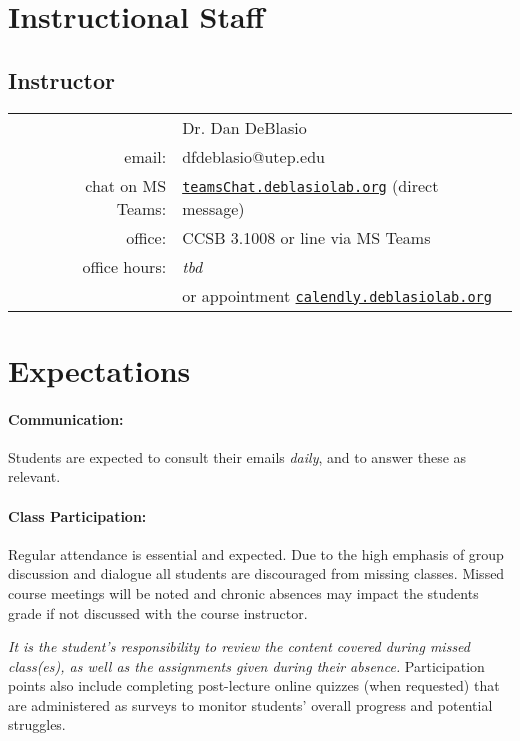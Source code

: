 \documentclass[12pt]{scrartcl}
\begin{document}
\section{Instructional Staff}

\subsection{Instructor}
\begin{tabular}{lrl}
& & Dr. Dan DeBlasio  \\
 & email: & dfdeblasio@utep.edu\\
 & chat on MS Teams: &  \href{http://teamsChat.deblasiolab.org}{\texttt{teamsChat.deblasiolab.org}} (direct message)\\
 & office: & CCSB 3.1008 or line via MS Teams\\
 & office hours: & \emph{tbd}\\
 & & or appointment \href{http://calendly.deblasiolab.org}{\texttt{calendly.deblasiolab.org}}\\
\end{tabular}


\section{Expectations}

\paragraph{Communication:} Students are expected to consult their emails \textit{daily}, and to answer these as relevant. 

\paragraph{Class Participation:} 
Regular attendance is essential and expected. 
Due to the high emphasis of group discussion and dialogue all students are discouraged from missing classes. 
Missed course meetings will be noted and chronic absences may impact the students grade if not discussed with the course instructor.

\textit{It is the student's responsibility to review the content covered during missed class(es), as well as the assignments given during their absence.}
Participation points also include completing post-lecture online quizzes (when requested) that are administered as surveys to monitor students’ overall progress and potential struggles.
\end{document}
